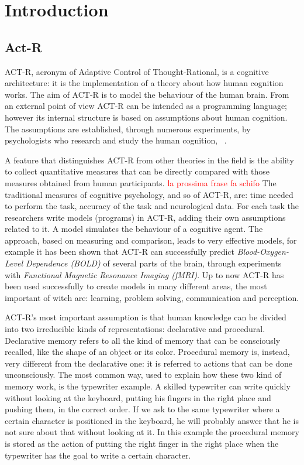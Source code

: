 \newcommand\todo[1]{\textcolor{red}{#1}}
\chapter{Introduction}
\section{Act-R}


ACT-R, acronym of Adaptive Control of Thought-Rational, is a cognitive architecture: it is the implementation of a theory about how human cognition works. 
The aim of \mbox{ACT-R} is to model the behaviour of the human brain. From an external point of view \mbox{ACT-R} can be intended as a programming language; however its internal structure is based on assumptions about human cognition. The assumptions are established, through numerous experiments, by psychologists who research and study the human cognition,  ~\cite{Allen94}. 

A feature that distinguishes \mbox{ACT-R} from other theories in the field is the ability to collect quantitative measures that can be directly compared with those measures obtained from human participants. \todo{la prossima frase fa schifo}
The traditional measures of cognitive psychology, and so of \mbox{ACT-R}, are: time needed to perform the task, accuracy of the task and neurological data. For each task the researchers write models (programs) in \mbox{ACT-R}, adding their own assumptions related to it. 
A model simulates the behaviour of a cognitive agent. The approach, based on measuring and comparison, leads to very effective models, for example it has been shown that \mbox{ACT-R} can successfully predict \emph{Blood-Oxygen-Level Dependence (BOLD)} of several parts of the brain, through experiments with \emph{Functional Magnetic Resonance Imaging (fMRI)}.
Up to now \mbox{ACT-R} has been used successfully to create models in many different areas, the most important of witch are: learning, problem solving, communication and perception.

\mbox{ACT-R's} most important assumption is that human knowledge can be divided into two irreducible kinds of representations: declarative and procedural.
Declarative memory refers to all the kind of memory that can be consciously recalled, like the shape of an object or its color. Procedural memory is, instead, very different from the declarative one: it is referred to actions that can be done unconsciously. The most common way, used to explain how these two kind of memory work, is the typewriter example.
A skilled typewriter can write quickly without looking at the keyboard, putting his fingers in the right place and pushing them, in the correct order. If we ask to the same typewriter where a certain character is positioned in the keyboard, he will probably answer that he is not sure about that without looking at it. In this example the procedural memory is stored as the action of putting the right finger in the right place when the typewriter has the goal to write a certain character.

